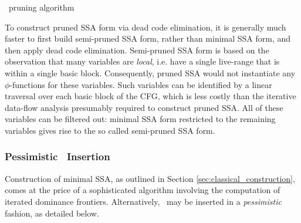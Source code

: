 \begin{algorithm}
\caption{\label{alg:classical_construction_algorithm:pruning}
\phifun\ pruning algorithm
}
\end{algorithm}

To construct pruned SSA form via dead code elimination,
it is generally much faster to first build semi-pruned SSA
form, rather than minimal SSA form, and then apply
dead code elimination.
Semi-pruned SSA form is based on the observation that
many variables are \emph{local}, i.e. have a single live-range that is
within a single basic block. Consequently, pruned SSA would not 
instantiate any $\phi$-functions for these variables.
Such variables can be identified by a linear traversal
over each basic block of the CFG, which is less costly
than the iterative data-flow analysis presumably required
to construct pruned SSA. 
All of these variables
can be filtered out: minimal SSA form restricted to the remaining variables gives rise to the so called semi-pruned SSA form.




\subsubsection*{Pessimistic \phifun\ Insertion}

Construction of minimal SSA,
as outlined in Section \ref{sec:classical_construction}, 
comes at the price of a sophisticated algorithm involving 
the computation of iterated dominance frontiers. 
Alternatively, \phifuns\ may be inserted in a \textit{pessimistic} fashion,
as detailed below.

